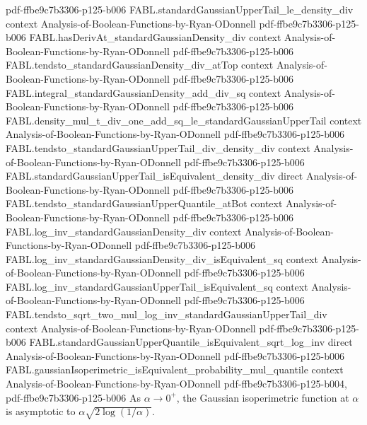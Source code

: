 \begin{theorem}
  {pdf-ffbe9c7b3306-p125-b006}
\proofstep
  {FABL.standardGaussianUpperTail_le_density_div}
  {context}
  {Analysis-of-Boolean-Functions-by-Ryan-ODonnell}
  {pdf-ffbe9c7b3306-p125-b006}
\proofstep
  {FABL.hasDerivAt_standardGaussianDensity_div}
  {context}
  {Analysis-of-Boolean-Functions-by-Ryan-ODonnell}
  {pdf-ffbe9c7b3306-p125-b006}
\proofstep
  {FABL.tendsto_standardGaussianDensity_div_atTop}
  {context}
  {Analysis-of-Boolean-Functions-by-Ryan-ODonnell}
  {pdf-ffbe9c7b3306-p125-b006}
\proofstep
  {FABL.integral_standardGaussianDensity_add_div_sq}
  {context}
  {Analysis-of-Boolean-Functions-by-Ryan-ODonnell}
  {pdf-ffbe9c7b3306-p125-b006}
\proofstep
  {FABL.density_mul_t_div_one_add_sq_le_standardGaussianUpperTail}
  {context}
  {Analysis-of-Boolean-Functions-by-Ryan-ODonnell}
  {pdf-ffbe9c7b3306-p125-b006}
\proofstep
  {FABL.tendsto_standardGaussianUpperTail_div_density_div}
  {context}
  {Analysis-of-Boolean-Functions-by-Ryan-ODonnell}
  {pdf-ffbe9c7b3306-p125-b006}
\proofstep
  {FABL.standardGaussianUpperTail_isEquivalent_density_div}
  {direct}
  {Analysis-of-Boolean-Functions-by-Ryan-ODonnell}
  {pdf-ffbe9c7b3306-p125-b006}
\proofstep
  {FABL.tendsto_standardGaussianUpperQuantile_atBot}
  {context}
  {Analysis-of-Boolean-Functions-by-Ryan-ODonnell}
  {pdf-ffbe9c7b3306-p125-b006}
\proofstep
  {FABL.log_inv_standardGaussianDensity_div}
  {context}
  {Analysis-of-Boolean-Functions-by-Ryan-ODonnell}
  {pdf-ffbe9c7b3306-p125-b006}
\proofstep
  {FABL.log_inv_standardGaussianDensity_div_isEquivalent_sq}
  {context}
  {Analysis-of-Boolean-Functions-by-Ryan-ODonnell}
  {pdf-ffbe9c7b3306-p125-b006}
\proofstep
  {FABL.log_inv_standardGaussianUpperTail_isEquivalent_sq}
  {context}
  {Analysis-of-Boolean-Functions-by-Ryan-ODonnell}
  {pdf-ffbe9c7b3306-p125-b006}
\proofstep
  {FABL.tendsto_sqrt_two_mul_log_inv_standardGaussianUpperTail_div}
  {context}
  {Analysis-of-Boolean-Functions-by-Ryan-ODonnell}
  {pdf-ffbe9c7b3306-p125-b006}
\proofstep
  {FABL.standardGaussianUpperQuantile_isEquivalent_sqrt_log_inv}
  {direct}
  {Analysis-of-Boolean-Functions-by-Ryan-ODonnell}
  {pdf-ffbe9c7b3306-p125-b006}
\proofstep
  {FABL.gaussianIsoperimetric_isEquivalent_probability_mul_quantile}
  {context}
  {Analysis-of-Boolean-Functions-by-Ryan-ODonnell}
  {pdf-ffbe9c7b3306-p125-b004,
    pdf-ffbe9c7b3306-p125-b006}
As $\alpha\to0^+$, the Gaussian isoperimetric function at $\alpha$ is asymptotic to
$\alpha\sqrt{2\log(1/\alpha)}$.
\end{theorem}
